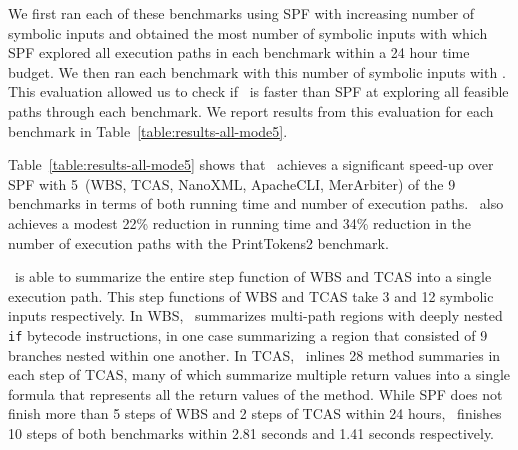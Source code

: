 We first ran each of these benchmarks using SPF with increasing number of symbolic inputs and obtained the most number
of symbolic inputs with which SPF explored all execution paths in each benchmark within a 24 hour time budget.
%
We then ran each benchmark with this number of symbolic inputs with \tool.
%
This evaluation allowed us to check if \tool\ is faster than SPF at exploring all feasible paths through each benchmark.
%
%
We report results from this evaluation for each benchmark in Table~\ref{table:results-all-mode5}.
%
%

%

%
Table~\ref{table:results-all-mode5} shows that \tool\ achieves a significant speed-up over SPF with
5~(WBS, TCAS, NanoXML, ApacheCLI, MerArbiter) of the 9 benchmarks in terms of both running time and number of
execution paths.
%
\tool\ also achieves a modest 22\% reduction in running time and 34\% reduction
in the number of execution paths with the PrintTokens2 benchmark.

\tool\ is able to summarize the entire step function of WBS and TCAS into a single execution path.
%
This step functions of WBS and TCAS take 3 and 12 symbolic inputs respectively.
%
In WBS, \tool\ summarizes multi-path regions with deeply nested {\tt if} bytecode instructions, in one case
summarizing a region that consisted of 9 branches nested within one another.
%
In TCAS, \tool\ inlines 28 method summaries in each step of TCAS, many of which summarize multiple return values
into a single formula that represents all the return values of the method.
%
While SPF does not finish more than 5 steps of WBS and 2 steps of TCAS within 24 hours, \tool\ finishes 10 steps of both
benchmarks within 2.81 seconds and 1.41 seconds respectively.

